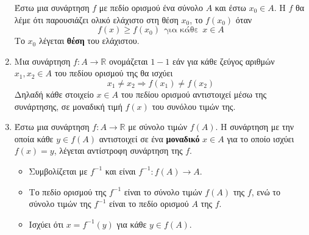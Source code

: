 \begin{enumerate}
Έστω μια συνάρτηση $ f $ με πεδίο ορισμού ένα σύνολο $ A $ και έστω $ x_0\in A $. Η $ f $ θα λέμε ότι παρουσιάζει ολικό ελάχιστο στη θέση $ x_0 $, το $ f(x_0) $ όταν 
\[ f(x)\geq f(x_0)\ \ \textrm{για κάθε}\ \ x\in A \]
Το $ x_0 $ λέγεται \textbf{θέση} του ελάχιστου.
\item
Μια συνάρτηση $ f:A\rightarrow\mathbb{R} $ ονομάζεται $ 1-1 $ εάν για κάθε ζεύγος αριθμών $ x_1,x_2\in A $ του πεδίου ορισμού της θα ισχύει \[ x_1\neq x_2\Rightarrow f(x_1)\neq f(x_2) \]
Δηλαδή κάθε στοιχείο $ x\in A $ του πεδίου ορισμού αντιστοιχεί μέσω της συνάρτησης, σε μοναδική τιμή $ f(x) $ του συνόλου τιμών της.
\item
Έστω μια συνάρτηση $ f:A\to\mathbb{R} $ με σύνολο τιμών $ f(A) $. Η συνάρτηση με την οποία κάθε $ y\in f(A) $ αντιστοιχεί σε ένα \textbf{μοναδικό} $ x\in A $ για το οποίο ισχύει $ f(x)=y $, λέγεται αντίστροφη συνάρτηση της $ f $.
\begin{center}
\end{center}
\begin{itemize}[itemsep=0mm]
\item Συμβολίζεται με $ f^{-1} $ και είναι $ f^{-1}:f(A)\to A $.
\item Το πεδίο ορισμού της $ f^{-1} $ είναι το σύνολο τιμών $ f(A) $ της $ f $, ενώ το σύνολο τιμών της $ f^{-1} $ είναι το πεδίο ορισμού $ A $ της $ f $.
\item Ισχύει ότι $ x=f^{-1}(y) $ για κάθε $ y\in f(A) $.
\end{itemize}
\end{enumerate}
\mbox{}\\\\
